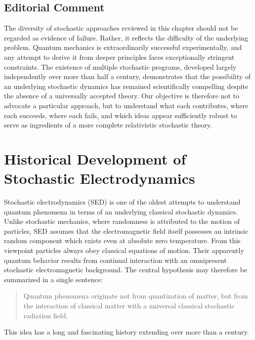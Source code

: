 \subsection*{Editorial Comment}
The diversity of stochastic approaches reviewed in this chapter should
not be regarded as evidence of failure. Rather, it reflects the
difficulty of the underlying problem.
Quantum mechanics is extraordinarily successful experimentally, and any
attempt to derive it from deeper principles faces exceptionally
stringent constraints. The existence of multiple stochastic programs,
developed largely independently over more than half a century,
demonstrates that the possibility of an underlying stochastic dynamics
has remained scientifically compelling despite the absence of a
universally accepted theory.
Our objective is therefore not to advocate a particular approach, but to
understand what each contributes, where each succeeds, where each fails,
and which ideas appear sufficiently robust to serve as ingredients of a
more complete relativistic stochastic theory.
\section{Historical Development of Stochastic Electrodynamics}
\label{sec:SEDHistory}
Stochastic electrodynamics (SED) is one of the oldest attempts to
understand quantum phenomena in terms of an underlying classical
stochastic dynamics. Unlike stochastic mechanics, where randomness is
attributed to the motion of particles, SED assumes that the
electromagnetic field itself possesses an intrinsic random component
which exists even at absolute zero temperature.
From this viewpoint particles always obey classical equations of motion.
Their apparently quantum behavior results from continual interaction
with an omnipresent stochastic electromagnetic background.
The central hypothesis may therefore be summarized in a single sentence:
\begin{quote}
Quantum phenomena originate not from quantization of matter, but from
the interaction of classical matter with a universal classical
stochastic radiation field.
\end{quote}
This idea has a long and fascinating history extending over more than a
century.
